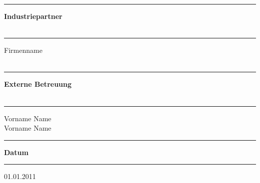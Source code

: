 \begin{titlepage}
\begin{minipage}[b]{0.91\textwidth}
	\begin{minipage}[b]{0.27\textwidth}
	\hrule\vskip 0.5cm
		\textbf{Industriepartner}\\
		\\
	\end{minipage}
	\begin{minipage}[b]{0.03\textwidth}
	\hskip 0.5cm
	\end{minipage}
	\begin{minipage}[b]{0.7\textwidth}
	\hrule\vskip 0.5cm
		Firmenname\\
		\\
	\end{minipage}
	
	\begin{minipage}[b]{0.27\textwidth}
	\hrule\vskip 0.5cm
		\textbf{Externe Betreuung}\\
		\\
	\end{minipage}
	\begin{minipage}[b]{0.03\textwidth}
	\hskip 0.5cm
	\end{minipage}
	\begin{minipage}[b]{0.7\textwidth}
	\hrule\vskip 0.5cm
		Vorname Name\\
		Vorname Name\\
	\end{minipage}
	
	\begin{minipage}[b]{0.27\textwidth}
	\hrule\vskip 0.5cm
		\textbf{Datum}
	\end{minipage}
	\begin{minipage}[b]{0.03\textwidth}
	\hskip 0.5cm
	\end{minipage}
	\begin{minipage}[b]{0.7\textwidth}
	\hrule\vskip 0.5cm
		01.01.2011
	\end{minipage}
\end{minipage}
\vskip 0.5cm



\end{titlepage}
